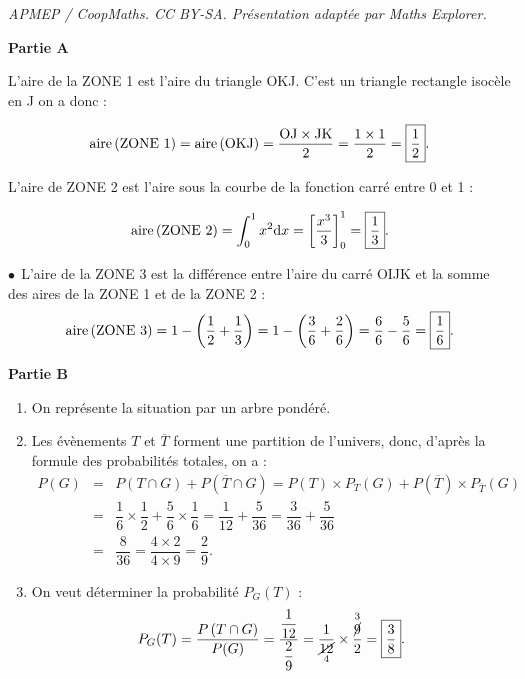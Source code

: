 \documentclass[10pt]{article}
\renewcommand{\d}{{\mathrm{d}}}
\begin{document}
\noindent\textit{APMEP / CoopMaths. CC BY-SA. Présentation adaptée par Maths Explorer.}\par\medskip
\smallskip

\textbf{Partie A}

\medskip

L'aire de la ZONE 1 est l'aire du triangle OKJ. C'est un triangle rectangle isocèle en J on a donc :

\[\text{aire\,(ZONE 1)} = \text{aire\,(OKJ)} = \dfrac{\mathrm{OJ} \times \mathrm{JK}}{2} = \dfrac{1\times 1}{2} = \boxed{\dfrac{1}{2}}.\]

\smallskip

L'aire de ZONE 2 est l'aire sous la courbe de la fonction carré entre 0 et 1 :

\[\text{aire\,(ZONE 2)} = \int_{0}^{1}x^{2}\d x = \left[\dfrac{x^{3}}{3}\right]_{0}^{1} = \boxed{\dfrac{1}{3}}.\]
\smallskip

$\bullet~~$L'aire de la ZONE 3 est la différence entre l'aire du carré OIJK et la somme des aires de la ZONE 1 et de la ZONE 2 :
\[\text{aire\,(ZONE 3)} = 1  - \left(\dfrac{1}{2} + \dfrac{1}{3}\right) = 1 - \left(\dfrac{3}{6} + \dfrac{2}{6}\right) = \dfrac{6}{6} - \dfrac{5}{6} = \boxed{\dfrac{1}{6}}.\]





\medskip

\textbf{Partie B}

\medskip

\begin{enumerate}
	\item On représente la situation par un arbre pondéré.
	
	\begin{center}
	\end{center}
	\item Les évènements $T$ et $\overline{T}$ forment une partition de l'univers, donc, d'après la formule des probabilités totales, on a :
	\begin{eqnarray*}
		P(G) &=& P\left(T \cap G\right) + P\left(\overline{T} \cap G\right) = P(T) \times P_{T}(G) + P\left(\overline{T}\right) \times P_{\overline{T}}(G)\\
		&=& \dfrac{1}{6} \times \dfrac{1}{2} + \dfrac{5}{6} \times \dfrac{1}{6} = \dfrac{1}{12} + \dfrac{5}{36} = \dfrac{3}{36} + \dfrac{5}{36}\\
		&=& \dfrac{8}{36} = \dfrac{4 \times 2}{4 \times 9} =  \boxed{\dfrac{2}{9}}.
	\end{eqnarray*}
	\item On veut déterminer la probabilité $P_{G}(T)$ :
	\[P_{G}(T) = \dfrac{P\left(T \cap G\right)}{P(G)} = \dfrac{\dfrac{1}{12}}{\dfrac{2}{9}} = \dfrac{1}{\underset{4}{\cancel{12}}} \times \dfrac{\overset{3}{\cancel{9}}}{2} = \boxed{\dfrac{3}{8}}.\]
\end{enumerate}
\end{document}
